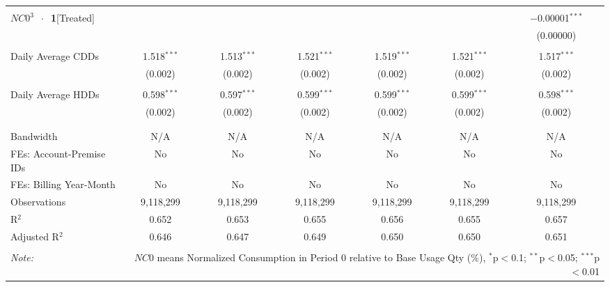 \begin{table}[!htbp]
\begin{adjustbox}{scale = 0.8}
\begin{tabular}{@{\extracolsep{25pt}}lcccccc}
  & & & & & & \\ 
 $NC0^{3}$  $\ \cdot \ $ \textbf{1}[Treated] &  &  &  &  &  & $-$0.00001$^{***}$ \\ 
  &  &  &  &  &  & (0.00000) \\ 
  & & & & & & \\ 
 Daily Average CDDs & 1.518$^{***}$ & 1.513$^{***}$ & 1.521$^{***}$ & 1.519$^{***}$ & 1.521$^{***}$ & 1.517$^{***}$ \\ 
  & (0.002) & (0.002) & (0.002) & (0.002) & (0.002) & (0.002) \\ 
  & & & & & & \\ 
 Daily Average HDDs & 0.598$^{***}$ & 0.597$^{***}$ & 0.599$^{***}$ & 0.599$^{***}$ & 0.599$^{***}$ & 0.598$^{***}$ \\ 
  & (0.002) & (0.002) & (0.002) & (0.002) & (0.002) & (0.002) \\ 
  & & & & & & \\ 
\hline \\[-1.8ex] 
Bandwidth & N/A & N/A & N/A & N/A & N/A & N/A \\ 
FEs: Account-Premise IDs & No & No & No & No & No & No \\ 
FEs: Billing Year-Month & No & No & No & No & No & No \\ 
Observations & 9,118,299 & 9,118,299 & 9,118,299 & 9,118,299 & 9,118,299 & 9,118,299 \\ 
R$^{2}$ & 0.652 & 0.653 & 0.655 & 0.656 & 0.655 & 0.657 \\ 
Adjusted R$^{2}$ & 0.646 & 0.647 & 0.649 & 0.650 & 0.650 & 0.651 \\ 
\hline 
\hline \\[-1.8ex] 
\textit{Note:}  & \multicolumn{6}{r}{$NC0$ means Normalized Consumption in Period 0 relative to Base Usage Qty (\%), $^{*}$p$<$0.1; $^{**}$p$<$0.05; $^{***}$p$<$0.01} \\ 
\end{tabular} 
\end{adjustbox}
\end{table} 
